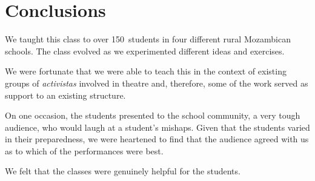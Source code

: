 \documentclass[article,twocolumn,twoside]{memoir}
\begin{document}
\chapter{Conclusions}

We taught this class to over 150~students in four different rural Mozambican
schools. The class evolved as we experimented different ideas and exercises.

We were fortunate that we were able to teach this in the context of existing
groups of \textit{activistas} involved in theatre and, therefore, some of the
work served as support to an existing structure.

On one occasion, the students presented to the school community, a very tough
audience, who would laugh at a student's mishaps. Given that the students
varied in their preparedness, we were heartened to find that the audience
agreed with us as to which of the performances were best.

We felt that the classes were genuinely helpful for the students.
\end{document}
